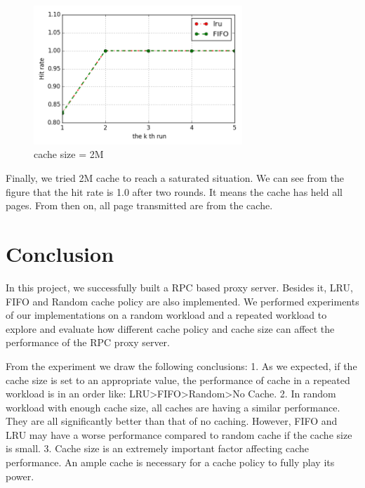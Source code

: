 \documentclass[paper=a4, fontsize=11pt]{scrartcl} %
\numberwithin{equation}{section} %
\numberwithin{figure}{section} %
\numberwithin{table}{section} %
\begin{document}
\begin{figure}[h]
  \centering
  \includegraphics[width=0.7\textwidth]{../data/hit2M}
  \caption{cache size = 2M}
  \label{fig:time2M}
\end{figure}
Finally, we tried 2M cache to reach a saturated situation. We can see from the figure that the hit rate is 1.0 after two rounds. It means the cache has held all pages. From then on, all page transmitted are from the cache. 
\section{Conclusion}
In this project, we successfully built a RPC based proxy server. Besides it, LRU, FIFO and Random cache policy are also implemented. We performed experiments of our implementations on a random workload and a repeated workload to explore and evaluate how different cache policy and cache size can affect the performance of the RPC proxy server. 

From the experiment we draw the following conclusions:
1. As we expected, if the cache size is set to an appropriate value, the performance of cache in a repeated workload is in an order like: LRU>FIFO>Random>No Cache.
2. In random workload with enough cache size, all caches are having a similar performance. They are all significantly better than that of no caching. However, FIFO and LRU may have a worse performance compared to random cache if the cache size is small. 
3. Cache size is an extremely important factor affecting cache performance. An ample cache is necessary for a cache policy to fully play its power. 
\end{document}
